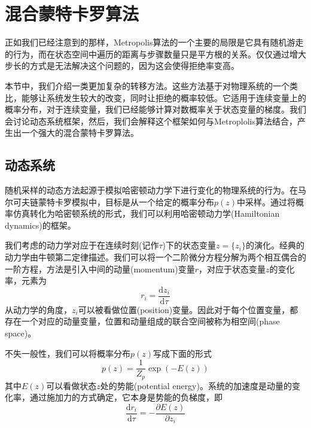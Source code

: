 \section{混合蒙特卡罗算法}
正如我们已经注意到的那样，Metropolis算法的一个主要的局限是它具有随机游走的行为，而在状态空间中遍历的距离与步骤数量只是平方根的关系。仅仅通过增大步长的方式是无法解决这个问题的，因为这会使得拒绝率变高。

本节中，我们介绍一类更加复杂的转移方法。这些方法基于对物理系统的一个类比，能够让系统发生较大的改变，同时让拒绝的概率较低。它适用于连续变量上的概率分布，对于连续变量，我们已经能够计算对数概率关于状态变量的梯度。我们会讨论动态系统框架，然后，我们会解释这个框架如何与Metroplolis算法结合，产生出一个强大的混合蒙特卡罗算法。
\subsection*{动态系统}
随机采样的动态方法起源于模拟哈密顿动力学下进行变化的物理系统的行为。在马尔可夫链蒙特卡罗模拟中，目标是从一个给定的概率分布$p(z)$中采样。通过将概率仿真转化为哈密顿系统的形式，我们可以利用哈密顿动力学(Hamiltonian dynamics)的框架。

我们考虑的动力学对应于在连续时刻(记作$\tau$)下的状态变量$z=\{z_i\}$的演化。经典的动力学由牛顿第二定律描述。我们可以将一个二阶微分方程分解为两个相互偶合的一阶方程，方法是引入中间的动量(momentum)变量$r$，对应于状态变量$z$的变化率，元素为
\begin{equation}
	r_i=\frac{\mathrm{d}z_i}{\mathrm{d}\tau}
\end{equation}
从动力学的角度，$z_i$可以被看做位置(position)变量。因此对于每个位置变量，都存在一个对应的动量变量，位置和动量组成的联合空间被称为相空间(phase space)。

不失一般性，我们可以将概率分布$p(z)$写成下面的形式
\begin{equation}
	p(z)=\frac{1}{Z_p}\exp (-E(z))
\end{equation}
其中$E(z)$可以看做状态$z$处的势能(potential energy)。系统的加速度是动量的变化率，通过施加力的方式确定，它本身是势能的负梯度，即
\begin{equation}
	\frac{\mathrm{d}r_i}{\mathrm{d}\tau}=-\frac{\partial E(z)}{\partial z_i}
\end{equation}

